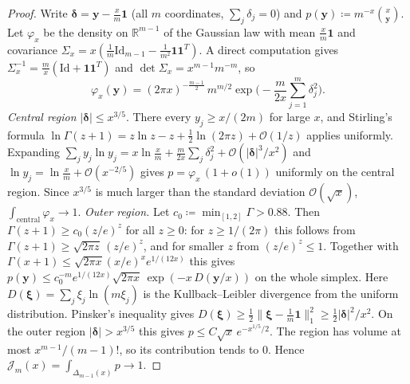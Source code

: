 \documentclass[11pt,a4paper]{article}
\theoremstyle{plain}
\theoremstyle{definition}
\theoremstyle{remark}
\numberwithin{equation}{section}
\providecommand{\Id}{\mathrm{Id}}
\begin{document}
\begin{proof}
Write $\boldsymbol{\delta} = \mathbf{y} - \frac{x}{m}\mathbf{1}$ (all $m$ coordinates, $\sum_j \delta_j = 0$) and $p(\mathbf{y}) \coloneqq m^{-x}\binom{x}{\mathbf{y}}$. Let $\varphi_x$ be the density on $\mathbb{R}^{m-1}$ of the Gaussian law with mean $\frac{x}{m}\mathbf{1}$ and covariance $\Sigma_x = x(\frac{1}{m}\Id_{m-1} - \frac{1}{m^2}\mathbf{1}\mathbf{1}^T)$. A direct computation gives $\Sigma_x^{-1} = \frac{m}{x}(\Id + \mathbf{1}\mathbf{1}^T)$ and $\det\Sigma_x = x^{m-1}m^{-m}$, so
\[
\varphi_x(\mathbf{y}) = (2\pi x)^{-\frac{m-1}{2}}\, m^{m/2} \exp\Big(-\frac{m}{2x}\sum_{j=1}^m \delta_j^2\Big).
\]
\emph{Central region} $|\boldsymbol{\delta}| \le x^{3/5}$. There every $y_j \ge x/(2m)$ for large $x$, and Stirling's formula $\ln\Gamma(z+1) = z\ln z - z + \frac12\ln(2\pi z) + \mathcal{O}(1/z)$ applies uniformly. Expanding $\sum_j y_j\ln y_j = x\ln\frac{x}{m} + \frac{m}{2x}\sum_j\delta_j^2 + \mathcal{O}(|\boldsymbol{\delta}|^3/x^2)$ and $\ln y_j = \ln\frac{x}{m} + \mathcal{O}(x^{-2/5})$ gives $p = \varphi_x\,(1 + o(1))$ uniformly on the central region. Since $x^{3/5}$ is much larger than the standard deviation $\mathcal{O}(\sqrt{x})$, $\int_{\mathrm{central}}\varphi_x \to 1$.
\emph{Outer region.} Let $c_0 \coloneqq \min_{[1,2]}\Gamma > 0.88$. Then $\Gamma(z+1) \ge c_0 (z/e)^z$ for all $z \ge 0$: for $z \ge 1/(2\pi)$ this follows from $\Gamma(z+1) \ge \sqrt{2\pi z}\,(z/e)^z$, and for smaller $z$ from $(z/e)^z \le 1$. Together with $\Gamma(x+1) \le \sqrt{2\pi x}(x/e)^x e^{1/(12x)}$ this gives $p(\mathbf{y}) \le c_0^{-m} e^{1/(12x)}\sqrt{2\pi x}\,\exp(-x\,D(\mathbf{y}/x))$ on the whole simplex. Here $D(\boldsymbol{\xi}) = \sum_j \xi_j\ln(m\xi_j)$ is the Kullback--Leibler divergence from the uniform distribution. Pinsker's inequality gives $D(\boldsymbol{\xi}) \ge \frac12\|\boldsymbol{\xi} - \frac1m\mathbf{1}\|_1^2 \ge \frac12|\boldsymbol{\delta}|^2/x^2$. On the outer region $|\boldsymbol{\delta}| > x^{3/5}$ this gives $p \le C\sqrt{x}\,e^{-x^{1/5}/2}$. The region has volume at most $x^{m-1}/(m-1)!$, so its contribution tends to $0$.
Hence $\mathcal{J}_m(x) = \int_{\Delta_{m-1}(x)} p \to 1$.
\end{proof}
\end{document}
